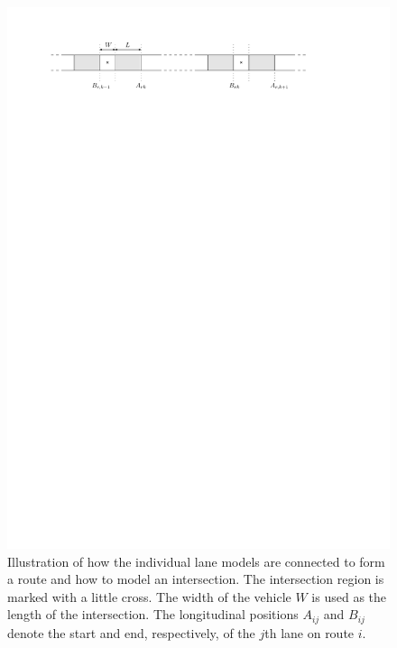 \documentclass[a4paper]{article}
\theoremstyle{definition}
\theoremstyle{plain}
\begin{document}
\begin{figure}
  \centering
  \includegraphics[scale=1]{figures/motion/intersection}
  \caption{Illustration of how the individual lane models are connected to form
    a route and how to model an intersection. The intersection region is marked
    with a little cross. The width of the vehicle $W$ is used as the length of
    the intersection. The longitudinal positions $A_{ij}$ and $B_{ij}$ denote
    the start and end, respectively, of the $j$th lane on route $i$.}%
  \label{fig:intersection}
\end{figure}
\end{document}
